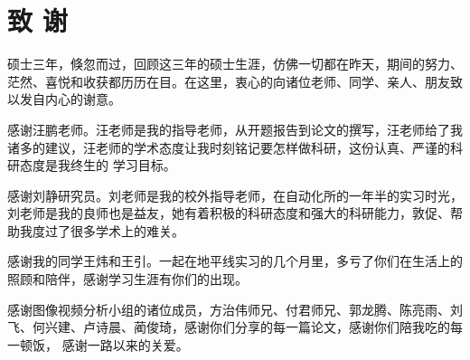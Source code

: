 \documentclass[figurelist,tablelist,algorithmlist,nomlist,masters]{Style/seuthesix}
\begin{document}
\chapter*{致 谢}
硕士三年，倏忽而过，回顾这三年的硕士生涯，仿佛一切都在昨天，期间的努力、茫然、喜悦和收获都历历在目。在这里，衷心的向诸位老师、同学、亲人、朋友致以发自内心的谢意。

感谢汪鹏老师。汪老师是我的指导老师，从开题报告到论文的撰写，汪老师给了我诸多的建议，汪老师的学术态度让我时刻铭记要怎样做科研，这份认真、严谨的科研态度是我终生的
学习目标。

感谢刘静研究员。刘老师是我的校外指导老师，在自动化所的一年半的实习时光，刘老师是我的良师也是益友，她有着积极的科研态度和强大的科研能力，敦促、帮助我度过了很多学术上的难关。

感谢我的同学王炜和王引。一起在地平线实习的几个月里，多亏了你们在生活上的照顾和陪伴，感谢学习生涯有你们的出现。

感谢图像视频分析小组的诸位成员，方治伟师兄、付君师兄、郭龙腾、陈亮雨、刘飞、何兴建、卢诗晨、蔺俊琦，感谢你们分享的每一篇论文，感谢你们陪我吃的每一顿饭，
感谢一路以来的关爱。


 
       
\end{document}
